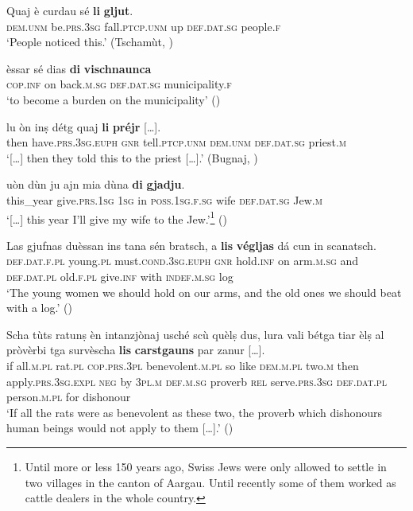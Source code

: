 \ea\label{ex:li1}
\gll  Quaj è curdau sé \textbf{li} \textbf{gljut}.\\
     \textsc{dem.unm} be.\textsc{prs.3sg} fall.\textsc{ptcp.unm} up \textsc{def.dat.sg} people.\textsc{f}\\
\glt `People noticed this.' (Tschamùt,  \citealt[12]{Büchli1966})
\z

\ea\label{ex:li2}
\gll  èssar sé dias \textbf{di} \textbf{vischnaunca}\\
\textsc{cop.inf} on back\textsc{.m.sg} \textsc{def.dat.sg} municipality.\textsc{f}\\
\glt `to become a burden on the municipality' ()
\z

\ea\label{ex:li3}
\gll […] lu òn inṣ détg quaj \textbf{li} \textbf{préjr} […].\\
{} then have.\textsc{prs.3sg.euph} \textsc{gnr} tell.\textsc{ptcp.unm} \textsc{dem.unm} \textsc{def.dat.sg} priest.\textsc{m}\\
\glt `[…] then they told this to the priest […].' (Bugnaj, \citealt[143]{Büchli1966})
\z

\ea\label{ex:li4}
\gll […] uòn dùn ju ajn mia dùna \textbf{di} \textbf{gjadju}.\\
{} this\_year give.\textsc{prs.1sg} \textsc{1sg} in \textsc{poss.1sg.f.sg} wife \textsc{def.dat.sg} Jew.\textsc{m} \\
\glt `[…] this year I’ll give my wife to the Jew.'\footnote{Until more or less 150 years ago, Swiss Jews were only allowed to settle in two villages in the canton of Aargau. Until recently some of them worked as cattle dealers in the whole country.} (\citealt[69]{Berther1998})
\z

\ea\label{ex:li5}
\gll   Las gjufnas duèssan ins tana sén bratsch, a \textbf{lis} \textbf{végljas} dá cun in scanatsch.\\
\textsc{def.dat.f.pl} young.\textsc{pl} must.\textsc{cond.3sg.euph} \textsc{gnr} hold.\textsc{inf} on arm.\textsc{m.sg} and \textsc{def.dat.pl} old.\textsc{f.pl} give.\textsc{inf} with \textsc{indef.m.sg} log\\
\glt `The young women we should hold on our arms, and the old ones we should beat with a log.' ()
\z

\ea\label{ex:li6}
\gll  Scha tùts ratunṣ èn intanzjònaj usché scù quèlṣ dus, lura vali bétga tiar èlṣ al pròvèrbi tga survèscha \textbf{lis} \textbf{carstgauns} par zanur […].\\
     if all.\textsc{m.pl} rat.\textsc{pl} \textsc{cop.prs.3pl} benevolent.\textsc{m.pl} so like \textsc{dem.m.pl} two.\textsc{m} then apply.\textsc{prs.3sg.expl}  \textsc{neg}  by \textsc{3pl.m}  \textsc{def.m.sg} proverb \textsc{rel}  serve.\textsc{prs.3sg}  \textsc{def.dat.pl} person.\textsc{m.pl} for dishonour\\
\glt `If all the rats were as benevolent as these two, the proverb which dishonours human beings would not apply to them […].' (\citealt[199]{ASR1889})
\z

